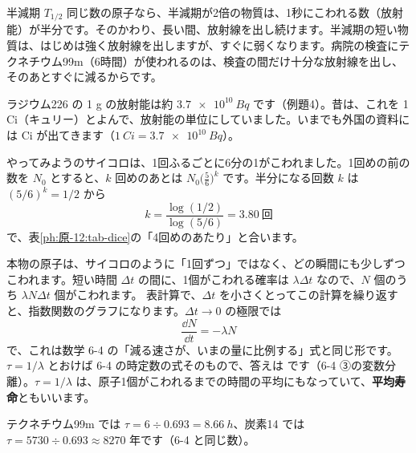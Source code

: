 \begin{phbaisuru}{半減期 $T_{1/2}$}
同じ数の原子なら、半減期が2倍の物質は、1秒にこわれる数（放射能）が半分です。そのかわり、長い間、放射線を出し続けます。半減期の短い物質は、はじめは強く放射線を出しますが、すぐに弱くなります。病院の検査にテクネチウム99m（6時間）が使われるのは、検査の間だけ十分な放射線を出し、そのあとすぐに減るからです。
\end{phbaisuru}

\begin{phmijika}[昔の単位キュリー]
ラジウム226 の 1 g の放射能は約 $\qty{3.7e10}{Bq}$ です（例題4）。昔は、これを 1 Ci（キュリー）とよんで、放射能の単位にしていました。いまでも外国の資料には Ci が出てきます（$\qty{1}{Ci}=\qty{3.7e10}{Bq}$）。
\end{phmijika}

\label{ph:原-12:sec5}
やってみようのサイコロは、1回ふるごとに6分の1がこわれました。1回めの前の数を $N_0$ とすると、$k$ 回めのあとは $N_0\bigl(\tfrac56\bigr)^k$ です。半分になる回数 $k$ は $(5/6)^k=1/2$ から
\[ k=\frac{\log(1/2)}{\log(5/6)}=3.80\ \text{回} \]
で、表\ref{ph:原-12:tab-dice}の「4回めのあたり」と合います。

本物の原子は、サイコロのように「1回ずつ」ではなく、どの瞬間にも少しずつこわれます。短い時間 $\Delta t$ の間に、1個がこわれる確率は $\lambda\Delta t$ なので、$N$ 個のうち $\lambda N\Delta t$ 個がこわれます。
表計算で、$\Delta t$ を小さくとってこの計算を繰り返すと、指数関数のグラフになります。$\Delta t\to0$ の極限では
\[ \frac{\dd N}{\dd t}=-\lambda N \]
で、これは数学 6-4 の「減る速さが、いまの量に比例する」式と同じ形です。$\tau=1/\lambda$ とおけば 6-4 の時定数の式そのもので、答えは
\label{ph:原-12:law}です（6-4 ③の変数分離）。$\tau=1/\lambda$ は、原子1個がこわれるまでの時間の平均にもなっていて、\textbf{平均寿命}ともいいます。

\begin{phflow}
\end{phflow}
テクネチウム99m では $\tau=6\div0.693=\qty{8.66}{h}$、炭素14 では $\tau=5730\div0.693\approx8270$ 年です（6-4 と同じ数）。

